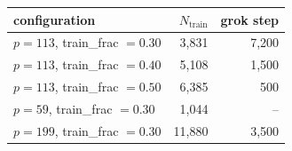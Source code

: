 \begin{tabular}{lrr}
\toprule
configuration & $N_{\mathrm{train}}$ & grok step \\
\midrule
$p = 113$, train\_frac $= 0.30$ & 3,831 & 7,200 \\
$p = 113$, train\_frac $= 0.40$ & 5,108 & 1,500 \\
$p = 113$, train\_frac $= 0.50$ & 6,385 & 500 \\
$p = 59$, train\_frac $= 0.30$ & 1,044 & -- \\
$p = 199$, train\_frac $= 0.30$ & 11,880 & 3,500 \\
\bottomrule
\end{tabular}
